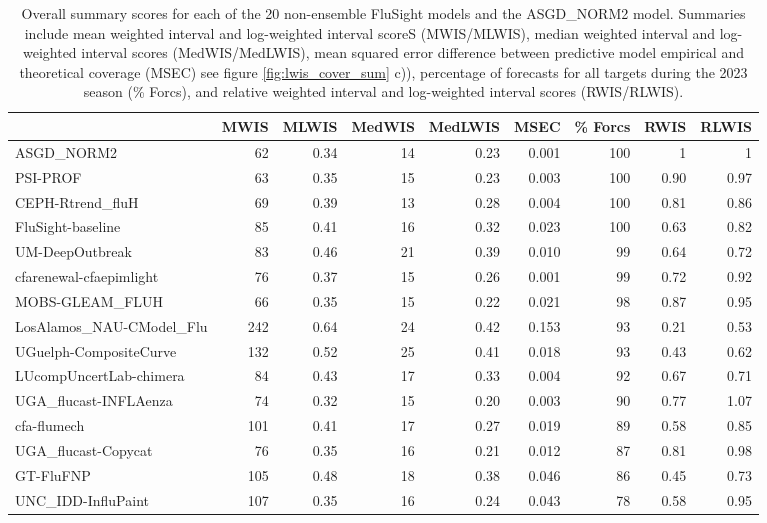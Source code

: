 \begin{table}[ht]
\centering
\begin{adjustwidth}{-3cm}{-1.5cm}
\caption{Overall summary scores for each of the 20 non-ensemble FluSight
models and the ASGD\_NORM2 model. Summaries include mean weighted interval
and log-weighted interval scoreS (MWIS/MLWIS), 
median weighted interval and log-weighted interval scores (MedWIS/MedLWIS), 
mean squared error
difference between predictive model empirical and theoretical coverage (MSEC)
see figure \ref{fig:lwis_cover_sum} c)), percentage of forecasts for all 
targets during the 2023 season (\% Forcs), and relative weighted interval
and log-weighted interval scores (RWIS/RLWIS).}
\begin{tabular}{lrrrrrrrr}
 & MWIS & MLWIS & MedWIS & MedLWIS & MSEC & \% Forcs & RWIS & RLWIS\\ 
  \hline
ASGD\_NORM2 & 62 & 0.34 & 14 & 0.23 & 0.001 & 100 & 1 & 1 \\ 
  PSI-PROF & 63 & 0.35 & 15 & 0.23 & 0.003 & 100 & 0.90 & 0.97 \\ 
  CEPH-Rtrend\_fluH & 69 & 0.39 & 13 & 0.28 & 0.004 & 100 & 0.81 & 0.86 \\ 
  FluSight-baseline & 85 & 0.41 & 16 & 0.32 & 0.023 & 100 & 0.63 & 0.82 \\ 
  UM-DeepOutbreak & 83 & 0.46 & 21 & 0.39 & 0.010 & 99 & 0.64 & 0.72 \\ 
  cfarenewal-cfaepimlight & 76 & 0.37 & 15 & 0.26 & 0.001 & 99 & 0.72 & 0.92 \\ 
  MOBS-GLEAM\_FLUH & 66 & 0.35 & 15 & 0.22 & 0.021 & 98 & 0.87 & 0.95 \\ 
  LosAlamos\_NAU-CModel\_Flu & 242 & 0.64 & 24 & 0.42 & 0.153 & 93 & 0.21 & 0.53 \\ 
  UGuelph-CompositeCurve & 132 & 0.52 & 25 & 0.41 & 0.018 & 93 & 0.43 & 0.62 \\ 
  LUcompUncertLab-chimera & 84 & 0.43 & 17 & 0.33 & 0.004 & 92 & 0.67 & 0.71 \\ 
  UGA\_flucast-INFLAenza & 74 & 0.32 & 15 & 0.20 & 0.003 & 90 & 0.77 & 1.07 \\ 
  cfa-flumech & 101 & 0.41 & 17 & 0.27 & 0.019 & 89 & 0.58 & 0.85 \\ 
  UGA\_flucast-Copycat & 76 & 0.35 & 16 & 0.21 & 0.012 & 87 & 0.81 & 0.98 \\ 
  GT-FluFNP & 105 & 0.48 & 18 & 0.38 & 0.046 & 86 & 0.45 & 0.73 \\ 
  UNC\_IDD-InfluPaint & 107 & 0.35 & 16 & 0.24 & 0.043 & 78 & 0.58 & 0.95 \\ 

\end{tabular}
\end{adjustwidth}
\end{table}
